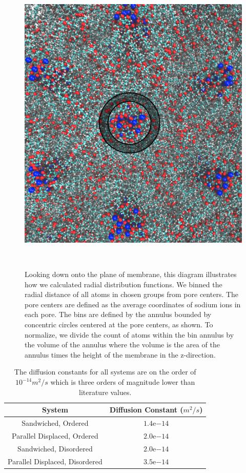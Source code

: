 \documentclass[journal=jpcbfk,manusciprt=article]{achemso}
\begin{document}
  \begin{figure}[!htb]
	\centering
	\includegraphics[width=0.75\linewidth]{radial_distribution_annulus.png}
	\caption{Looking down onto the plane of membrane, this diagram
		illustrates how we calculated radial distribution
		functions. We binned the radial distance of all atoms in 
                chosen groups from pore centers. The pore centers are 
                defined as the average coordinates of sodium ions in each
                pore. The bins are defined by the annulus bounded by concentric
		circles centered at the pore centers, as shown. To normalize, we
		divide the count of atoms within the bin annulus by the volume of
                the annulus where the volume is the area of the annulus times the
                height of the membrane in the z-direction.}~\label{fig:rdf_diagram}
  \end{figure}

  \begin{table}[h]
  \centering
  \begin{tabular}{cc}
  \toprule
  System & Diffusion Constant ($m^2/s$) \\ 
  \midrule
  Sandwiched, Ordered & $1.4\mathrm{e}{-14}$ \\
  Parallel Displaced, Ordered & $2.0\mathrm{e}{-14}$ \\
  Sandwiched, Disordered & $2.0\mathrm{e}{-14}$ \\
  Parallel Displaced, Disordered & $3.5\mathrm{e}{-14}$ \\
  \bottomrule
  \end{tabular}
  \caption{The diffusion constants for all systems are on the order of $10^{-14} m^2/s$ 
  which is three orders of magnitude lower than literature values.}~\label{table:msd}
  \end{table}
\end{document}
